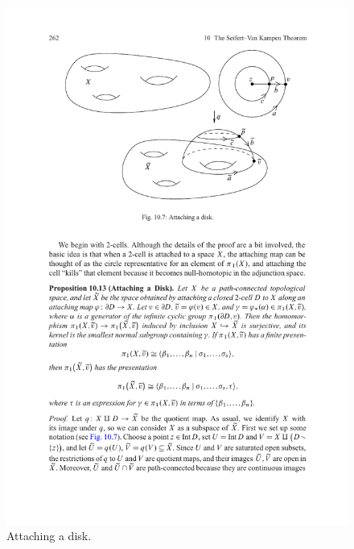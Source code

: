 \begin{figure}[htbp]
\centering
\includegraphics{pictures/attaching-disk}
\caption{Attaching a disk.}
\end{figure}
